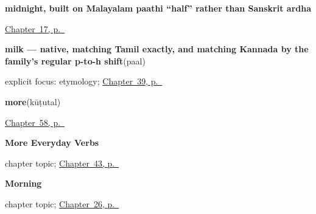 \noindent\begin{minipage}[t]{\linewidth}
\raggedright
\textbf{midnight, built on Malayalam paathi \textquotedblleft{}half\textquotedblright{} rather than Sanskrit ardha}\enspace\emph{}\par
\footnotesize \hyperref[ch:ml-noon-and-midnight]{Chapter~17, p.~\pageref*{ch:ml-noon-and-midnight}}
\end{minipage}\par\smallskip

\noindent\begin{minipage}[t]{\linewidth}
\raggedright
\textbf{milk — native, matching Tamil exactly, and matching Kannada by the family's regular p-to-h shift}\enspace\emph{}\enspace(paal)\par
\footnotesize explicit focus: etymology; \hyperref[ch:ml-tea-coffee-milk]{Chapter~39, p.~\pageref*{ch:ml-tea-coffee-milk}}
\end{minipage}\par\smallskip

\noindent\begin{minipage}[t]{\linewidth}
\raggedright
\textbf{more}\enspace\emph{}\enspace(kūṭutal)\par
\footnotesize \hyperref[ch:ml-five-more-short-answers]{Chapter~58, p.~\pageref*{ch:ml-five-more-short-answers}}
\end{minipage}\par\smallskip

\noindent\begin{minipage}[t]{\linewidth}
\raggedright
\textbf{More Everyday Verbs}\par
\footnotesize chapter topic; \hyperref[ch:ml-more-verbs]{Chapter~43, p.~\pageref*{ch:ml-more-verbs}}
\end{minipage}\par\smallskip

\noindent\begin{minipage}[t]{\linewidth}
\raggedright
\textbf{Morning}\par
\footnotesize chapter topic; \hyperref[ch:ml-morning]{Chapter~26, p.~\pageref*{ch:ml-morning}}
\end{minipage}\par\smallskip

